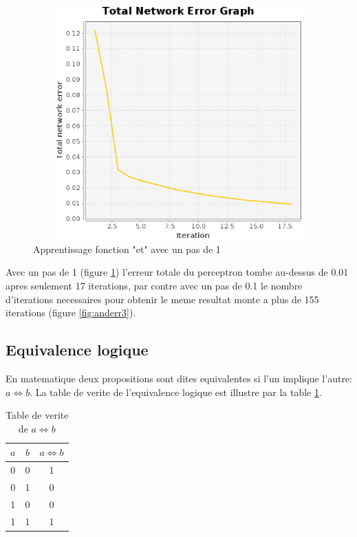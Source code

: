 \documentclass[twoside,openright,a4paper,11pt,french]{article}
\begin{document}
\begin{figure}[h]
\centering
\includegraphics[width=12cm,height=9cm]{./pics/and_error4.eps}
\caption{Apprentissage fonction "et" avec un pas de 1}
\label{fig:anderr4}
\end{figure}

Avec un pas de 1 (figure \ref{fig:anderr4}) l'erreur totale du perceptron
tombe au-dessus de 0.01 apres seulement 17 iterations, par contre avec 
un pas de 0.1 le nombre d'iterations necessaires pour obtenir le meme
resultat monte a plus de 155 iterations (figure \ref{fig:anderr3}).


\subsection{Equivalence logique}
En matematique deux propositions sont dites equivalentes si l'un implique
l'autre: $a \Leftrightarrow b$. La table de verite de l'equivalence logique
est illustre par la table \ref{tab:eq}.


\begin{table}[h]
  \centering
  \begin{tabular}{| c | c | c |}
    \hline
    \textbf{$a$} & \textbf{$b$} & \textbf{$a \Leftrightarrow b$}\\
    \hline
    0 & 0  & 1 \\
    \hline
    0 & 1  & 0 \\
    \hline
    1 & 0  & 0 \\
    \hline
    1 & 1  & 1 \\
    \hline
  \end{tabular}
  \caption{Table de verite de $a \Leftrightarrow b$}
  \label{tab:eq}
\end{table}
\end{document}
